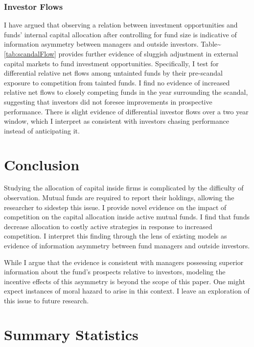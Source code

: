 \documentclass[openany]{book}
\theoremstyle{definition}
\theoremstyle{definition}
\theoremstyle{definition}
\theoremstyle{remark}
\begin{document}
\subsection{Investor Flows}

I have argued that observing a relation between investment opportunities
and funds' internal capital allocation after controlling for fund size
is indicative of information asymmetry between managers and outside
investors. Table\textasciitilde{}\ref{tab:scandalFlow} provides further
evidence of sluggish adjustment in external capital markets to fund
investment opportunities. Specifically, I test for differential relative
net flows among untainted funds by their pre-scandal exposure to
competition from tainted funds. I find no evidence of increased relative
net flows to closely competing funds in the year surrounding the
scandal, suggesting that investors did not foresee improvements in
prospective performance. There is slight evidence of differential
investor flows over a two year window, which I interpret as consistent
with investors chasing performance instead of anticipating it.

\chapter{Conclusion}\label{sec:conclusion}

Studying the allocation of capital inside firms is complicated by the
difficulty of observation. Mutual funds are required to report their
holdings, allowing the researcher to sidestep this issue. I provide
novel evidence on the impact of competition on the capital allocation
inside active mutual funds. I find that funds decrease allocation to
costly active strategies in response to increased competition. I
interpret this finding through the lens of existing models as evidence
of information asymmetry between fund managers and outside investors.

While I argue that the evidence is consistent with managers possessing
superior information about the fund's prospects relative to investors,
modeling the incentive effects of this asymmetry is beyond the scope of
this paper. One might expect instances of moral hazard to arise in this
context. I leave an exploration of this issue to future research.

\hypertarget{refs}{}

\appendix


\chapter{Summary Statistics}\label{summary-statistics}
\end{document}
